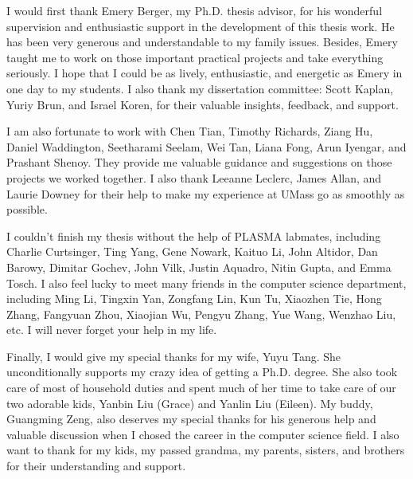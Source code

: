 I would first thank Emery Berger, my Ph.D. thesis advisor, for his wonderful supervision and enthusiastic support in the development of this thesis work. He has been very generous and understandable to my family issues. Besides, Emery taught me to work on those important practical projects and take everything seriously. I hope that I could be as lively, enthusiastic, and energetic as Emery in one day to my students.  I also thank my dissertation committee: Scott Kaplan, Yuriy Brun, and Israel Koren, for their valuable insights, feedback, and support. 

I am also fortunate to work with Chen Tian, Timothy Richards, Ziang Hu, Daniel Waddington, Seetharami Seelam, Wei Tan, Liana Fong, Arun Iyengar, and Prashant Shenoy. They provide me valuable guidance and suggestions on those projects we worked together. I also thank Leeanne Leclerc, James Allan, and Laurie Downey for their help to make my experience at UMass go as smoothly as possible. 

I couldn't finish my thesis without the help of PLASMA  labmates, including Charlie Curtsinger, Ting Yang, Gene Nowark, Kaituo Li, John Altidor, Dan Barowy, Dimitar Gochev, John Vilk, Justin Aquadro,  Nitin Gupta, and Emma Tosch. I also feel lucky to meet many friends in the computer science department, including Ming Li, Tingxin Yan, Zongfang Lin, Kun Tu, Xiaozhen Tie, Hong Zhang, Fangyuan Zhou, Xiaojian Wu, Pengyu Zhang, Yue Wang, Wenzhao Liu, etc. I will never forget your help in my life. 

Finally, I would give my special thanks for my wife, Yuyu Tang. She unconditionally supports my crazy idea of getting a Ph.D. degree. She also took care of most of household duties and spent much of her time to take care of our two adorable kids, Yanbin Liu (Grace) and Yanlin Liu (Eileen). My buddy, Guangming Zeng, also deserves my special thanks for his generous help and valuable discussion when I chosed the career in the computer science field. I also want to thank for my kids, my passed grandma, my parents, sisters, and brothers for their understanding and support.    

